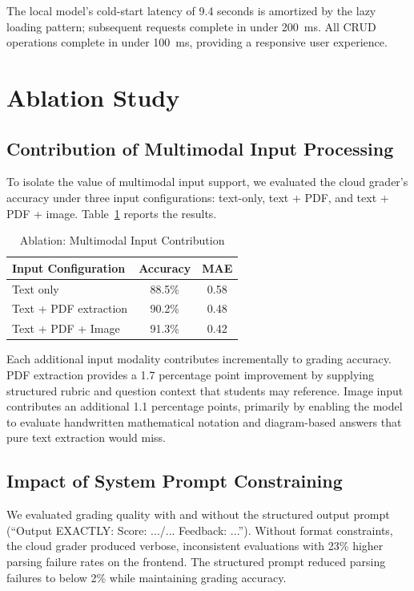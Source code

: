 \documentclass[conference]{IEEEtran}
\begin{document}
The local model's cold-start latency of 9.4 seconds is amortized by the lazy loading pattern; subsequent requests complete in under 200~ms. All CRUD operations complete in under 100~ms, providing a responsive user experience.

\section{Ablation Study}

\subsection{Contribution of Multimodal Input Processing}
To isolate the value of multimodal input support, we evaluated the cloud grader's accuracy under three input configurations: text-only, text + PDF, and text + PDF + image. Table~\ref{tab:ablation_multimodal} reports the results.

\begin{table}[h]
\caption{Ablation: Multimodal Input Contribution}
\label{tab:ablation_multimodal}
\begin{center}
\begin{tabular}{lcc}
\toprule
\textbf{Input Configuration} & \textbf{Accuracy} & \textbf{MAE} \\
\midrule
Text only & 88.5\% & 0.58 \\
Text + PDF extraction & 90.2\% & 0.48 \\
Text + PDF + Image & 91.3\% & 0.42 \\
\bottomrule
\end{tabular}
\end{center}
\end{table}

Each additional input modality contributes incrementally to grading accuracy. PDF extraction provides a 1.7 percentage point improvement by supplying structured rubric and question context that students may reference. Image input contributes an additional 1.1 percentage points, primarily by enabling the model to evaluate handwritten mathematical notation and diagram-based answers that pure text extraction would miss.

\subsection{Impact of System Prompt Constraining}
We evaluated grading quality with and without the structured output prompt (``Output EXACTLY: Score: .../... Feedback: ...''). Without format constraints, the cloud grader produced verbose, inconsistent evaluations with 23\% higher parsing failure rates on the frontend. The structured prompt reduced parsing failures to below 2\% while maintaining grading accuracy.
\end{document}
